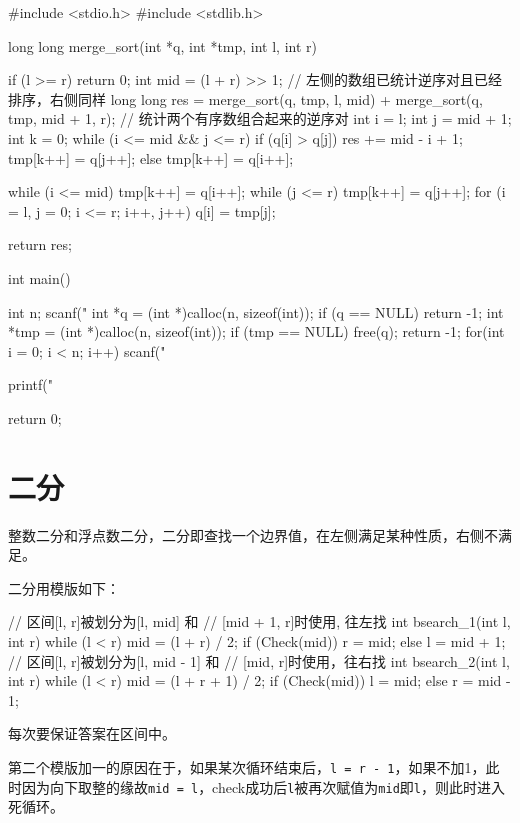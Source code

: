 \begin{mycpptwocol}[归并排序计算逆序对数量]
#include <stdio.h>
#include <stdlib.h>

long long merge_sort(int *q, int *tmp,
                     int l, int r) {
    if (l >= r) {
        return 0;
    }
    int mid = (l + r) >> 1;
    // 左侧的数组已统计逆序对且已经排序，右侧同样
    long long res = merge_sort(q, tmp, l, mid) + merge_sort(q, tmp, mid + 1, r);
    // 统计两个有序数组合起来的逆序对
    int i = l;
    int j = mid + 1;
    int k = 0;
    while (i <= mid && j <= r) {
        if (q[i] > q[j]) {
            res += mid - i + 1;
            tmp[k++] = q[j++];
        } else {
            tmp[k++] = q[i++];
        }
    }
    
    while (i <= mid) {
        tmp[k++] = q[i++];
    }
    while (j <= r) {
        tmp[k++] = q[j++];
    }
    for (i = l, j = 0; i <= r;
         i++, j++) {
        q[i] = tmp[j];
    }
    
    return res;
}

int main()
{
    int n;
    scanf("%
    int *q = (int *)calloc(n, sizeof(int));
    if (q == NULL) {
        return -1;
    }
    int *tmp = (int *)calloc(n, sizeof(int));
    if (tmp == NULL) {
        free(q);
        return -1;
    }
    for(int i = 0; i < n; i++) {
        scanf("%
    }
    
    printf("%

    return 0;
}
\end{mycpptwocol}
\section{二分}
整数二分和浮点数二分，二分即查找一个边界值，在左侧满足某种性质，右侧不满足。

二分用模版如下：
\begin{mycpptwocol}[二分模版]
// 区间[l, r]被划分为[l, mid] 和
// [mid + 1, r]时使用, 往左找
int bsearch_1(int l, int r)
{
    while (l < r) {
        mid = (l + r) / 2;
        if (Check(mid)) {
            r = mid;
        } else {
            l = mid + 1;
        }
    }
}
// 区间[l, r]被划分为[l, mid - 1] 和
// [mid, r]时使用，往右找
int bsearch_2(int l, int r)
{
    while (l < r) {
        mid = (l + r + 1) / 2;
        if (Check(mid)) {
            l = mid;
        } else {
            r = mid - 1;
        }
    }
}
\end{mycpptwocol}

\begin{keypoint}
    每次要保证答案在区间中。

    第二个模版加一的原因在于，如果某次循环结束后，\lstinline{l = r - 1}，如果不加1，此时因为向下取整的缘故\lstinline{mid = l}，check成功后\lstinline{l}被再次赋值为\lstinline{mid}即\lstinline{l}，则此时进入死循环。
\end{keypoint}

